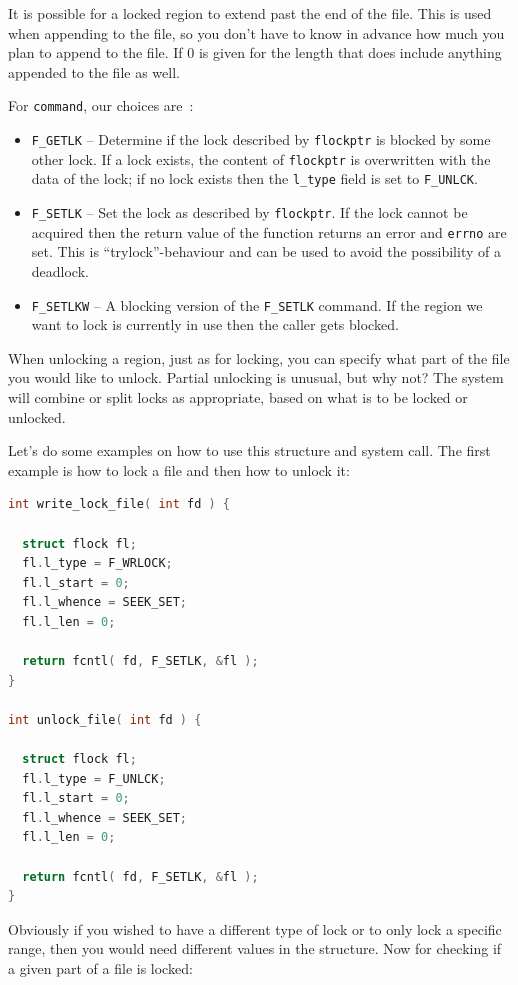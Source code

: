It is possible for a locked region to extend past the end of the file. This is used when appending to the file, so you don't have to know in advance how much you plan to append to the file. If 0 is given for the length that does include anything appended to the file as well.


For \texttt{command}, our choices are~\cite{apunix}:
\begin{itemize}
	\item \texttt{F\_GETLK} -- Determine if the lock described by \texttt{flockptr} is blocked by some other lock. If a lock exists, the content of \texttt{flockptr} is overwritten with the data of the lock; if no lock exists then the \texttt{l\_type} field is set to \texttt{F\_UNLCK}.
	\item \texttt{F\_SETLK} -- Set the lock as described by \texttt{flockptr}. If the lock cannot be acquired then the return value of the function returns an error and \texttt{errno} are set. This is ``trylock''-behaviour and can be used to avoid the possibility of a deadlock.
	\item \texttt{F\_SETLKW} -- A blocking version of the \texttt{F\_SETLK} command. If the region we want to lock is currently in use then the caller gets blocked.
\end{itemize}

When unlocking a region, just as for locking, you can specify what part of the file you would like to unlock. Partial unlocking is unusual, but why not? The system will combine or split locks as appropriate, based on what is to be locked or unlocked.

Let's do some examples on how to use this structure and system call. The first example is how to lock a file and then how to unlock it:

\begin{lstlisting}[language=C]
int write_lock_file( int fd ) {

  struct flock fl;
  fl.l_type = F_WRLOCK;
  fl.l_start = 0;
  fl.l_whence = SEEK_SET;
  fl.l_len = 0;
  
  return fcntl( fd, F_SETLK, &fl );
}

int unlock_file( int fd ) {

  struct flock fl;
  fl.l_type = F_UNLCK;
  fl.l_start = 0;
  fl.l_whence = SEEK_SET;
  fl.l_len = 0;
  
  return fcntl( fd, F_SETLK, &fl );
}
\end{lstlisting}

Obviously if you wished to have a different type of lock or to only lock a specific range, then you would need different values in the structure. Now for checking if a given part of a file is locked:

